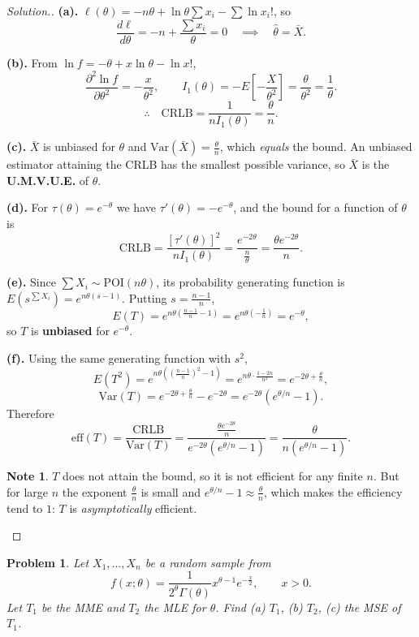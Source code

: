 \documentclass[12pt,a4paper]{report}
\theoremstyle{definition}
\newtheorem{note}[thm]{Note}
\theoremstyle{plain}
\newtheorem{problemx}{Problem}[section]
\newenvironment{problem}{\begin{problemx}}{\end{problemx}}
\newenvironment{solution}
  {\renewcommand{\qedsymbol}{}\begin{proof}[\textit{Solution}.]}
  {\end{proof}}
\begin{document}
\begin{solution}
\textbf{(a).} $\ell(\theta)=-n\theta+\ln\theta\sum x_i-\sum\ln x_i!$, so
\[\frac{d\ell}{d\theta}=-n+\frac{\sum x_i}{\theta}=0\quad\implies\quad
\hat\theta=\bar X.\]

\textbf{(b).} From $\ln f=-\theta+x\ln\theta-\ln x!$,
\[\frac{\partial^2\ln f}{\partial\theta^2}=-\frac{x}{\theta^2},\qquad
I_1(\theta)=-E\!\left[-\frac{X}{\theta^2}\right]=\frac{\theta}{\theta^2}
=\frac{1}{\theta}.\]
\[\therefore\quad \text{CRLB}=\frac{1}{nI_1(\theta)}=\frac{\theta}{n}.\]

\textbf{(c).} $\bar X$ is unbiased for $\theta$ and
$\text{Var}\left(\bar X\right)=\frac{\theta}{n}$, which \emph{equals} the bound. An
unbiased estimator attaining the CRLB has the smallest possible variance, so
$\bar X$ is the \textbf{U.M.V.U.E.} of $\theta$.

\textbf{(d).} For $\tau(\theta)=e^{-\theta}$ we have
$\tau'(\theta)=-e^{-\theta}$, and the bound for a function of $\theta$ is
\[\text{CRLB}=\frac{\left[\tau'(\theta)\right]^2}{nI_1(\theta)}
=\frac{e^{-2\theta}}{\frac{n}{\theta}}=\frac{\theta e^{-2\theta}}{n}.\]

\textbf{(e).} Since $\sum X_i\sim\text{POI}(n\theta)$, its probability generating
function is $E\left(s^{\sum X_i}\right)=e^{n\theta(s-1)}$. Putting
$s=\frac{n-1}{n}$,
\[E(T)=e^{n\theta\left(\frac{n-1}{n}-1\right)}
=e^{n\theta\left(-\frac{1}{n}\right)}=e^{-\theta},\]
so $T$ is \textbf{unbiased} for $e^{-\theta}$.

\textbf{(f).} Using the same generating function with $s^2$,
\[E\left(T^2\right)=e^{n\theta\left(\left(\frac{n-1}{n}\right)^2-1\right)}
=e^{n\theta\cdot\frac{1-2n}{n^2}}=e^{-2\theta+\frac{\theta}{n}},\]
\[\text{Var}(T)=e^{-2\theta+\frac{\theta}{n}}-e^{-2\theta}
=e^{-2\theta}\left(e^{\theta/n}-1\right).\]
Therefore
\[\text{eff}(T)=\frac{\text{CRLB}}{\text{Var}(T)}
=\frac{\frac{\theta e^{-2\theta}}{n}}{e^{-2\theta}\left(e^{\theta/n}-1\right)}
=\frac{\theta}{n\left(e^{\theta/n}-1\right)}.\]

\begin{note}
$T$ does not attain the bound, so it is not efficient for any finite $n$. But for
large $n$ the exponent $\frac{\theta}{n}$ is small and
$e^{\theta/n}-1\approx\frac{\theta}{n}$, which makes the efficiency tend to $1$:
$T$ is \emph{asymptotically} efficient.
\end{note}
\end{solution}

\begin{problem}
Let $X_1,\ldots,X_n$ be a random sample from
\[f(x;\theta)=\frac{1}{2^\theta\Gamma(\theta)}x^{\theta-1}e^{-\frac{x}{2}},
\qquad x>0.\]
Let $T_1$ be the MME and $T_2$ the MLE for $\theta$. Find (a) $T_1$, (b) $T_2$,
(c) the MSE of $T_1$.
\end{problem}
\end{document}
